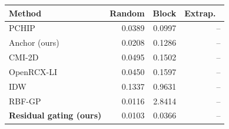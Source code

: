 \small
\begin{tabular}{lrrr}\toprule
Method & Random & Block & Extrap.\ \\\midrule
PCHIP & 0.0389 & 0.0997 & -- \\
Anchor (ours) & 0.0208 & 0.1286 & -- \\
CMI-2D & 0.0495 & 0.1502 & -- \\
OpenRCX-LI & 0.0450 & 0.1597 & -- \\
IDW & 0.1337 & 0.9631 & -- \\
RBF-GP & 0.0116 & 2.8414 & -- \\
\textbf{Residual gating (ours)} & 0.0103 & 0.0366 & -- \\
\bottomrule\end{tabular}
